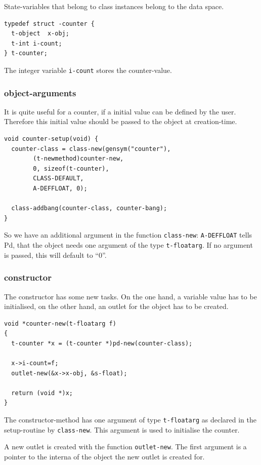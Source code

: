 \documentclass{ppgmus}
\begin{document}
State-variables that belong to class instances belong to the data space.

\begin{verbatim}
typedef struct -counter {
  t-object  x-obj;
  t-int i-count;
} t-counter;
\end{verbatim}

The integer variable \verb+i-count+ stores the counter-value.

\subsubsection{object-arguments}
It is quite useful for a counter, if a initial value can be defined by the user.
Therefore this initial value should be passed to the object at creation-time.

\begin{verbatim}
void counter-setup(void) {
  counter-class = class-new(gensym("counter"),
        (t-newmethod)counter-new,
        0, sizeof(t-counter),
        CLASS-DEFAULT,
        A-DEFFLOAT, 0);

  class-addbang(counter-class, counter-bang);
}
\end{verbatim}

So we have an additional argument in the function \verb+class-new+:
\verb+A-DEFFLOAT+ tells Pd, that the object needs one argument of the 
type \verb+t-floatarg+.
If no argument is passed, this will default to ``0''.

\subsubsection{constructor}
The constructor has some new tasks.
On the one hand, a variable value has to be initialised,
on the other hand, an outlet for the object has to be created.

\begin{verbatim}
void *counter-new(t-floatarg f)
{
  t-counter *x = (t-counter *)pd-new(counter-class);

  x->i-count=f;
  outlet-new(&x->x-obj, &s-float);

  return (void *)x;
}
\end{verbatim}

The constructor-method has one argument of type \verb+t-floatarg+ as declared
in the setup-routine by \verb+class-new+.
This argument is used to initialise the counter.

A new outlet is created with the function \verb+outlet-new+.
The first argument is a pointer to the interna of the object
the new outlet is created for.
\end{document}

